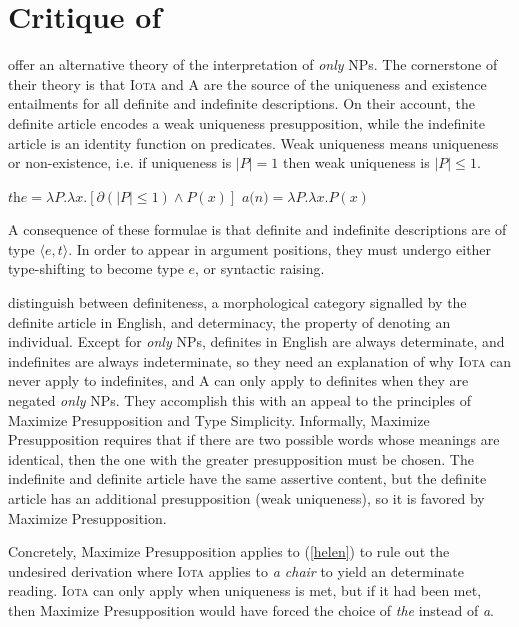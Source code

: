 \section{Critique of \citet{cb2015}\label{sec:coppock-beaver}}
\citet{cb2015} offer an alternative theory of the interpretation of \textit{only} NPs. The cornerstone of their theory is that \textsc{Iota} and \textsc{A} are the source of the uniqueness and existence entailments for all definite and indefinite descriptions. On their account, the definite article encodes a weak uniqueness presupposition, while the indefinite article is an identity function on predicates. Weak uniqueness means uniqueness or non-existence, i.e. if uniqueness is $|P| = 1$ then weak uniqueness is $|P| \le 1$.

\begin{exe}
	\ex $\textit{the} = \lambda P . \lambda x . [\partial(|P| \le 1) \land P(x)]$
	\ex $\textit{a(n)} = \lambda P . \lambda x . P(x)$
\end{exe}

A consequence of these formulae is that definite and indefinite descriptions are of type $\langle e, t \rangle$. In order to appear in argument positions, they must undergo either type-shifting to become type $e$, or syntactic raising.

\citeauthor{cb2015} distinguish between definiteness, a morphological category signalled by the definite article in English, and determinacy, the property of denoting an individual. Except for \textit{only} NPs, definites in English are always determinate, and indefinites are always indeterminate, so they need an explanation of why \textsc{Iota} can never apply to indefinites, and \textsc{A} can only apply to definites when they are negated \textit{only} NPs. They accomplish this with an appeal to the principles of Maximize Presupposition and Type Simplicity. Informally, Maximize Presupposition requires that if there are two possible words whose meanings are identical, then the one with the greater presupposition must be chosen. The indefinite and definite article have the same assertive content, but the definite article has an additional presupposition (weak uniqueness), so it is favored by Maximize Presupposition.

Concretely, Maximize Presupposition applies to (\ref{helen}) to rule out the undesired derivation where \textsc{Iota} applies to \textit{a chair} to yield an determinate reading. \textsc{Iota} can only apply when uniqueness is met, but if it had been met, then Maximize Presupposition would have forced the choice of \textit{the} instead of \textit{a}.

